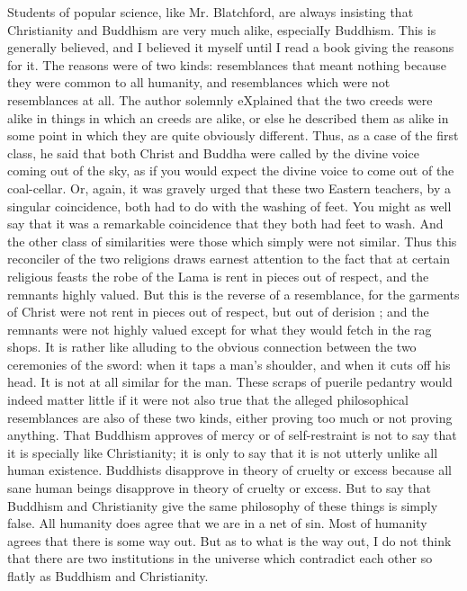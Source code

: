 \documentclass{book}
\begin{document}
Students of popular science, like Mr. Blatchford, are always insisting that Christianity and Buddhism are very much alike, especialIy Buddhism. This is generally believed, and I believed it myself until I read a book giving the reasons for it. The reasons were of two kinds: resemblances that meant nothing because they were common to all humanity, and resemblances which were not resemblances at all. The author solemnly eXplained that the two creeds were alike in things in which an creeds are alike, or else he described them as alike in some point in which they are quite obviously different. Thus, as a case of the first class, he said that both Christ and Buddha were called by the divine voice coming out of the sky, as if you would expect the divine voice to come out of the coal-cellar. Or, again, it was gravely urged that these two Eastern teachers, by a singular coincidence, both had to do with the washing of feet. You might as well say that it was a remarkable coincidence that they both had feet to wash. And the other class of similarities were those which simply were not similar. Thus this reconciler of the two religions draws earnest attention to the fact that at certain religious feasts the robe of the Lama is rent in pieces out of respect, and the remnants highly valued. But this is the reverse of a resemblance, for the garments of Christ were not rent in pieces out of respect, but out of derision ; and the remnants were not highly valued except for what they would fetch in the rag shops. It is rather like alluding to the obvious connection between the two ceremonies of the sword: when it taps a man’s shoulder, and when it cuts off his head. It is not at all similar for the man. These scraps of puerile pedantry would indeed matter little if it were not also true that the alleged philosophical resemblances are also of these two kinds, either proving too much or not proving anything. That Buddhism approves of mercy or of self-restraint is not to say that it is specially like Christianity; it is only to say that it is not utterly unlike all human existence. Buddhists disapprove in theory of cruelty or excess because all sane human beings disapprove in theory of cruelty or excess. But to say that Buddhism and Christianity give the same philosophy of these things is simply false. All humanity does agree that we are in a net of sin. Most of humanity agrees that there is some way out. But as to what is the way out, I do not think that there are two institutions in the universe which contradict each other so flatly as Buddhism and Christianity.
\end{document}
